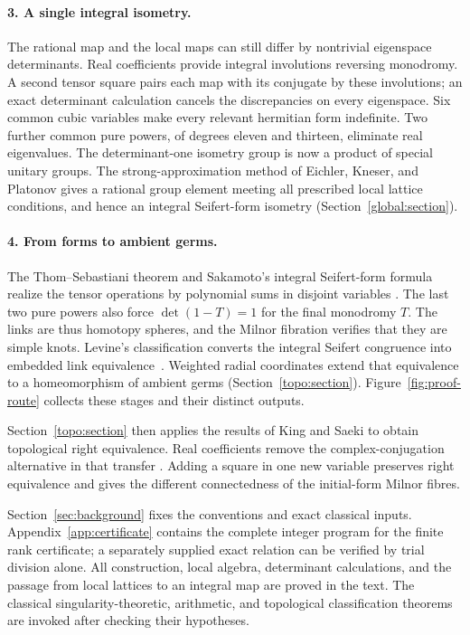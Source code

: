 \paragraph{3. A single integral isometry.}
The rational map and the local maps can still differ by nontrivial
eigenspace determinants. Real coefficients provide integral involutions
reversing monodromy. A second tensor square pairs each map with its
conjugate by these involutions; an exact determinant calculation cancels
the discrepancies on every eigenspace. Six common cubic variables make
every relevant hermitian form indefinite. Two further common pure
powers, of degrees eleven and thirteen, eliminate real eigenvalues.
The determinant-one isometry group is now a product of special unitary
groups. The strong-approximation method of Eichler, Kneser, and Platonov
\cite{Platonov1969,Platonov1970,Rapinchuk2014} gives a rational group
element meeting all prescribed local lattice conditions, and hence an
integral Seifert-form isometry (Section~\ref{global:section}).

\paragraph{4. From forms to ambient germs.}
The Thom--Sebastiani theorem and Sakamoto's integral Seifert-form formula
realize the tensor operations by polynomial sums in disjoint variables
\cite{SebastianiThom1971,Sakamoto1974}. The last two pure powers also
force $\det(1-T)=1$ for the final monodromy $T$. The links are thus
homotopy spheres, and the Milnor fibration verifies that they are simple
knots. Levine's classification converts the integral Seifert congruence
into embedded link equivalence~\cite{Levine1970}. Weighted radial
coordinates extend that equivalence to a homeomorphism of ambient germs
(Section~\ref{topo:section}). Figure~\ref{fig:proof-route} collects
these stages and their distinct outputs.

Section~\ref{topo:section} then applies the results of King and Saeki
to obtain topological right equivalence. Real coefficients remove the
complex-conjugation alternative in that transfer
\cite{King1978,Saeki1989,Sampaio2025Milnor}.
Adding a square in one new variable preserves right equivalence and
gives the different connectedness of the initial-form Milnor fibres.



Section~\ref{sec:background} fixes the conventions and exact classical
inputs. Appendix~\ref{app:certificate} contains the complete integer
program for the finite rank certificate; a separately supplied exact
relation can be verified by trial division alone. All construction,
local algebra, determinant calculations, and the passage from local
lattices to an integral map are proved in the text. The classical
singularity-theoretic, arithmetic, and topological classification
theorems are invoked after checking their hypotheses.

